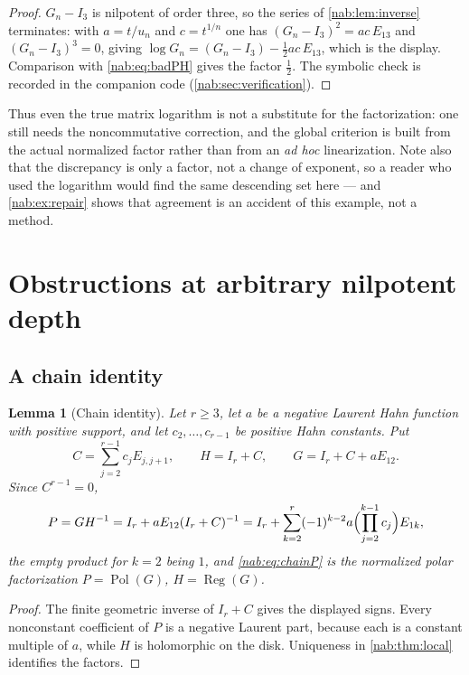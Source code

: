 \documentclass[11pt,letterpaper]{article}
\newtheorem{lemma}[lemma]{Lemma}
\theoremstyle{definition}
\theoremstyle{remark}
\newcommand{\Pol}{\operatorname{Pol}}
\newcommand{\Reg}{\operatorname{Reg}}
\numberwithin{equation}{section}
\begin{document}
\begin{proof}
$G_n-I_3$ is nilpotent of order three, so the series of
\cref{nab:lem:inverse} terminates: with $a=t/u_n$ and $c=t^{1/n}$ one has
$(G_n-I_3)^2=ac\,E_{13}$ and $(G_n-I_3)^3=0$, giving
$\log G_n=(G_n-I_3)-\tfrac12ac\,E_{13}$, which is the display. Comparison with
\eqref{nab:eq:badPH} gives the factor $\tfrac12$. The symbolic check is
recorded in the companion code (\cref{nab:sec:verification}).
\end{proof}

Thus even the true matrix logarithm is not a substitute for the factorization:
one still needs the noncommutative correction, and the global criterion is
built from the actual normalized factor rather than from an \emph{ad hoc}
linearization. Note also that the discrepancy is only a factor, not a change
of exponent, so a reader who used the logarithm would find the same descending
set here --- and \cref{nab:ex:repair} shows that agreement is an accident of
this example, not a method.

\section{Obstructions at arbitrary nilpotent depth}\label{nab:sec:depth}

\subsection{A chain identity}

\begin{lemma}[Chain identity]\label{nab:lem:chain}
Let $r\geq3$, let $a$ be a negative Laurent Hahn function with positive
support, and let $c_2,\ldots,c_{r-1}$ be positive Hahn constants. Put
\[
 C=\sum_{j=2}^{r-1}c_jE_{j,j+1},\qquad H=I_r+C,\qquad G=I_r+C+aE_{12}.
\]
Since $C^{r-1}=0$,
\begin{equation}\label{nab:eq:chainP}
 P=GH^{-1}=I_r+aE_{12}(I_r+C)^{-1}
  =I_r+\sum_{k=2}^{r}(-1)^{k-2}a\Bigl(\prod_{j=2}^{k-1}c_j\Bigr)E_{1k},
\end{equation}
the empty product for $k=2$ being $1$, and \eqref{nab:eq:chainP} is the
normalized polar factorization $P=\Pol(G)$, $H=\Reg(G)$.
\end{lemma}

\begin{proof}
The finite geometric inverse of $I_r+C$ gives the displayed signs. Every
nonconstant coefficient of $P$ is a negative Laurent part, because each is a
constant multiple of $a$, while $H$ is holomorphic on the disk. Uniqueness in
\cref{nab:thm:local} identifies the factors.
\end{proof}
\end{document}
